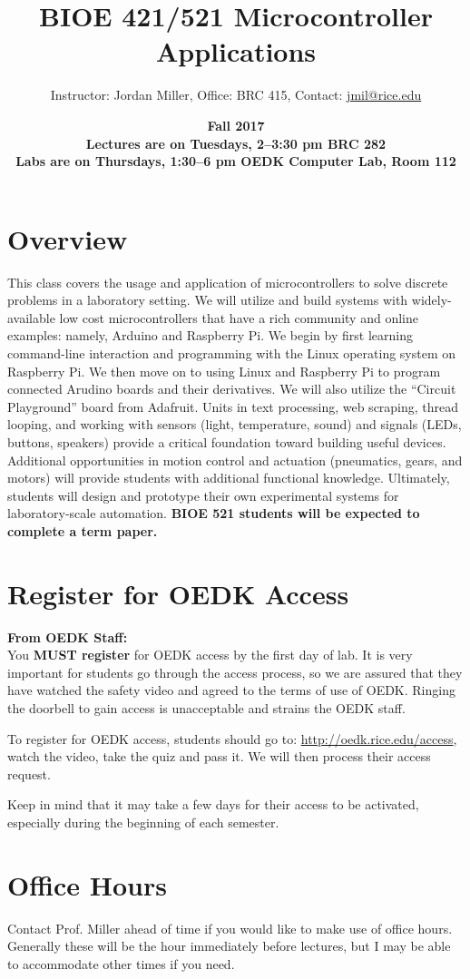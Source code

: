 \documentclass[10pt]{article}
\title{\textbf{BIOE 421/521 Microcontroller Applications}}
\date{\textbf{Fall 2017\\Lectures are on Tuesdays, 2--3:30 pm BRC 282\\Labs are on Thursdays, 1:30--6 pm OEDK Computer Lab, Room 112}}                                           %
\author{Instructor: Jordan Miller, Office: BRC 415, Contact: \href{mailto:jmil@rice.edu}{jmil@rice.edu}} %
\begin{document}
\maketitle

\section*{Overview}
This class covers the usage and application of microcontrollers to solve discrete problems in a laboratory setting. We will utilize and build systems with widely-available low cost microcontrollers that have a rich community and online examples: namely, Arduino and Raspberry Pi. We begin by first learning command-line interaction and programming with the Linux operating system on Raspberry Pi. We then move on to using Linux and Raspberry Pi to program connected Arudino boards and their derivatives. We will also utilize the ``Circuit Playground'' board from Adafruit. Units in text processing, web scraping, thread looping, and working with sensors (light, temperature, sound) and signals (LEDs, buttons, speakers) provide a critical foundation toward building useful devices. Additional opportunities in motion control and actuation (pneumatics, gears, and motors) will provide students with additional functional knowledge. Ultimately, students will design and prototype their own experimental systems for laboratory-scale automation. \textbf{BIOE 521 students will be expected to complete a term paper.}

\section*{Register for OEDK Access}
\textbf{From OEDK Staff:}\\
You \textbf{MUST register} for OEDK access by the first day of lab. It is very important for students go through the access process, so we are assured that they have watched the safety video and agreed to the terms of use of OEDK. Ringing the doorbell to gain access is unacceptable and strains the OEDK staff.  

To register for OEDK access, students should go to: \href{http://oedk.rice.edu/access}{http://oedk.rice.edu/access}, watch the video, take the quiz and pass it. We will then process their access request.

Keep in mind that it may take a few days for their access to be activated, especially during the beginning of each semester.

\section*{Office Hours}
Contact Prof. Miller ahead of time if you would like to make use of office hours. Generally these will be the hour immediately before lectures, but I may be able to accommodate other times if you need.
\end{document}
